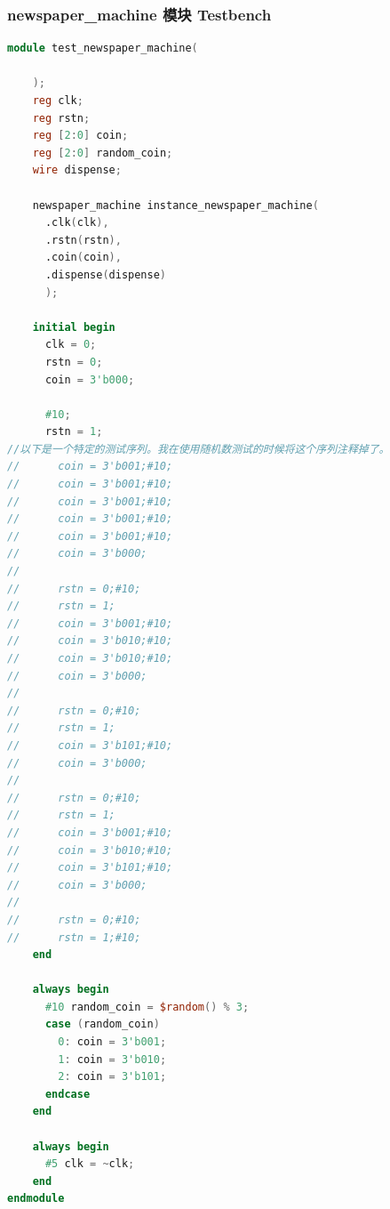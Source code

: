 \documentclass[zihao=5, UTF8]{article}
\theoremstyle{MyLineTheoremStyle} %
\theoremstyle{MyBlockTheoremStyle} %
\theoremstyle{MySubsubsectionStyle} %
\begin{document}
\subsubsection{newspaper\_machine 模块 Testbench}

\begin{lstlisting}[language=Verilog]
module test_newspaper_machine(

    );
    reg clk;
    reg rstn;
    reg [2:0] coin;
    reg [2:0] random_coin;
    wire dispense;

    newspaper_machine instance_newspaper_machine(
      .clk(clk),
      .rstn(rstn),
      .coin(coin),
      .dispense(dispense)
      );

    initial begin
      clk = 0;
      rstn = 0;
      coin = 3'b000;
      
      #10;
      rstn = 1;
//以下是一个特定的测试序列。我在使用随机数测试的时候将这个序列注释掉了。
//      coin = 3'b001;#10;
//      coin = 3'b001;#10;
//      coin = 3'b001;#10;
//      coin = 3'b001;#10;
//      coin = 3'b001;#10;
//      coin = 3'b000;
//      
//      rstn = 0;#10;
//      rstn = 1;
//      coin = 3'b001;#10;
//      coin = 3'b010;#10;
//      coin = 3'b010;#10;
//      coin = 3'b000;
//
//      rstn = 0;#10;
//      rstn = 1;
//      coin = 3'b101;#10;
//      coin = 3'b000;
//      
//      rstn = 0;#10;
//      rstn = 1;
//      coin = 3'b001;#10;
//      coin = 3'b010;#10;
//      coin = 3'b101;#10;
//      coin = 3'b000;
//
//      rstn = 0;#10;
//      rstn = 1;#10;
    end

    always begin
      #10 random_coin = $random() % 3;
      case (random_coin)
        0: coin = 3'b001;
        1: coin = 3'b010;
        2: coin = 3'b101;
      endcase
    end

    always begin
      #5 clk = ~clk;
    end
endmodule

\end{lstlisting}
\end{document}
